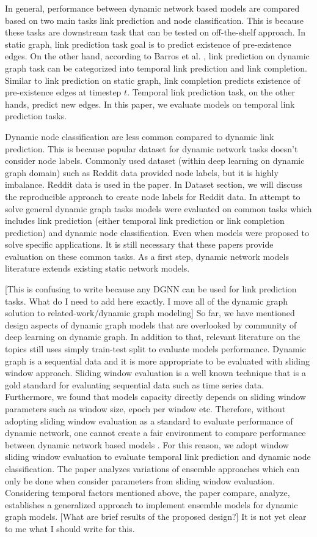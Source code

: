 \documentclass{IEEEtran}
\begin{document}
In general, performance between dynamic network based models are compared based on two main tasks link prediction and node classification. This is because these tasks are downstream task that can be tested on off-the-shelf approach. In static graph, link prediction task goal is to predict existence of pre-existence edges. On the other hand, according to Barros et al. \cite{barrosSurveyEmbeddingDynamic2021}, link prediction on dynamic graph task can be categorized into temporal link prediction and link completion. Similar to link prediction on static graph, link completion predicts existence of pre-existence edges at timestep \(t\). Temporal link prediction task, on the other hands, predict new edges. In this paper, we evaluate models on temporal link prediction tasks.

Dynamic node classification are less common compared to dynamic link prediction. This is because popular dataset for dynamic network tasks doesn't consider node labels. Commonly used dataset (within deep learning on dynamic graph domain) such as Reddit data provided node labels, but it is highly imbalance. Reddit data is used in the paper. In Dataset section, we will discuss the reproducible approach to create node labels for Reddit data.
In attempt to solve general dynamic graph tasks models were evaluated on common tasks which includes link prediction (either temporal link prediction or link completion prediction) and dynamic node classification. Even when models were proposed to solve specific applications. It is still necessary that these papers provide evaluation on these common tasks. As a first step, dynamic network models literature extends existing static network models.

[This is confusing to write because any DGNN can be used for link prediction tasks. What do I need to add here exactly. I move all of the dynamic graph solution to related-work/dynamic graph modeling]
So far, we have mentioned design aspects of dynamic graph models that are overlooked by community of deep learning on dynamic graph. In addition to that, relevant literature on the topics still uses simply train-test split to evaluate models performance. Dynamic graph is a sequential data and it is more appropriate to be evaluated with sliding window approach. Sliding window evaluation is a well known technique that is a gold standard for evaluating sequential data such as time series data. Furthermore, we found that models capacity directly depends on sliding window parameters such as window size, epoch per window etc. Therefore, without adopting sliding window evaluation as a standard to evaluate performance of dynamic network, one cannot create a fair environment to compare performance between dynamic network based models \cite{skarding2021benchmarking}. For this reason, we adopt window sliding window evaluation to evaluate temporal link prediction and dynamic node classification. The paper analyzes variations of ensemble approaches which can only be done when consider parameters from sliding window evaluation. Considering temporal factors mentioned above, the paper compare, analyze, establishes a generalized approach to implement ensemble models for dynamic graph models.
[What are brief results of the proposed design?] It is not yet clear to me what I should write for this.
\end{document}
